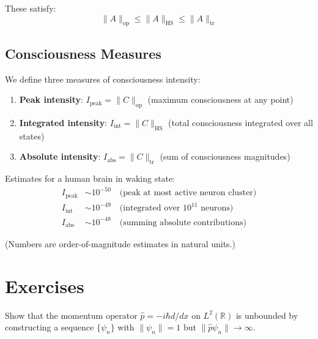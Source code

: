 These satisfy:
\begin{equation}
\| A \|_{\text{op}} \leq \| A \|_{\text{HS}} \leq \| A \|_{\text{tr}}
\end{equation}

\subsection{Consciousness Measures}

We define three measures of consciousness intensity:

\begin{definition}\label{def:consciousness-intensity-measures}
\begin{enumerate}
\item \textbf{Peak intensity}: $I_{\text{peak}} = \| C \|_{\text{op}}$ (maximum consciousness at any point)
\item \textbf{Integrated intensity}: $I_{\text{int}} = \| C \|_{\text{HS}}$ (total consciousness integrated over all states)
\item \textbf{Absolute intensity}: $I_{\text{abs}} = \| C \|_{\text{tr}}$ (sum of consciousness magnitudes)
\end{enumerate}
\end{definition}

\begin{example}\label{ex:human-brain-norms}
Estimates for a human brain in waking state:
\begin{align}
I_{\text{peak}} &\sim 10^{-50} \quad \text{(peak at most active neuron cluster)}\\
I_{\text{int}} &\sim 10^{-49} \quad \text{(integrated over $10^{11}$ neurons)}\\
I_{\text{abs}} &\sim 10^{-48} \quad \text{(summing absolute contributions)}
\end{align}

(Numbers are order-of-magnitude estimates in natural units.)
\end{example}

\section{Exercises}

\begin{exercise}
Show that the momentum operator $\hat{p} = -i\hbar d/dx$ on $L^2(\mathbb{R})$ is unbounded by constructing a sequence $\{\psi_n\}$ with $\|\psi_n\| = 1$ but $\|\hat{p}\psi_n\| \to \infty$.
\end{exercise}

